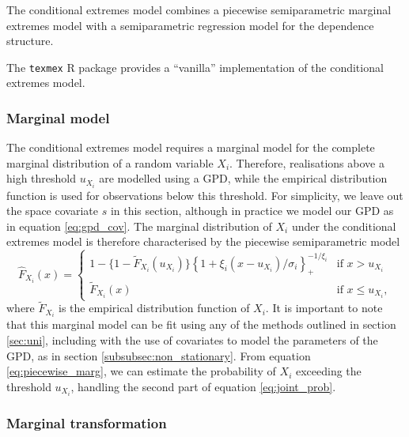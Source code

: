 \documentclass{article}
\numberwithin{equation}{section}
\begin{document}
The conditional extremes model combines a piecewise semiparametric marginal extremes model with a semiparametric regression model for the dependence structure. 


The \texttt{texmex} R package provides a ``vanilla'' implementation of the conditional extremes model. 

\subsubsection{Marginal model}

The conditional extremes model requires a marginal model for the complete marginal distribution of a random variable $X_i$.
Therefore, realisations above a high threshold $u_{X_i}$ are modelled using a GPD, while the empirical distribution function is used for observations below this threshold.
For simplicity, we leave out the space covariate $s$ in this section, although in practice we model our GPD as in equation \ref{eq:gpd_cov}.
The marginal distribution of $X_i$ under the conditional extremes model is therefore characterised by the piecewise semiparametric model
\begin{equation} \label{eq:piecewise_marg}
  \hat{F}_{X_i}(x) = \begin{cases}
    1 - \{ 1 - \tilde{F}_{X_i}(u_{X_i})\} \left\{1 + \xi_{i}(x - u_{X_i})/\sigma_i\right\}_{+}^{-1/\xi_{i}} & \text{if } x > u_{X_i} \\
    \tilde{F}_{X_i}(x) & \text{if } x \le u_{X_i},
  \end{cases}
\end{equation}
where $\tilde{F}_{X_i}$ is the empirical distribution function of $X_i$.
It is important to note that this marginal model can be fit using any of the methods outlined in section \ref{sec:uni}, including with the use of covariates to model the parameters of the GPD, as in section \ref{subsubsec:non_stationary}.
From equation \ref{eq:piecewise_marg}, we can estimate the probability of $X_i$ exceeding the threshold $u_{X_i}$, handling the second part of equation \ref{eq:joint_prob}.

\subsubsection{Marginal transformation}
\end{document}
